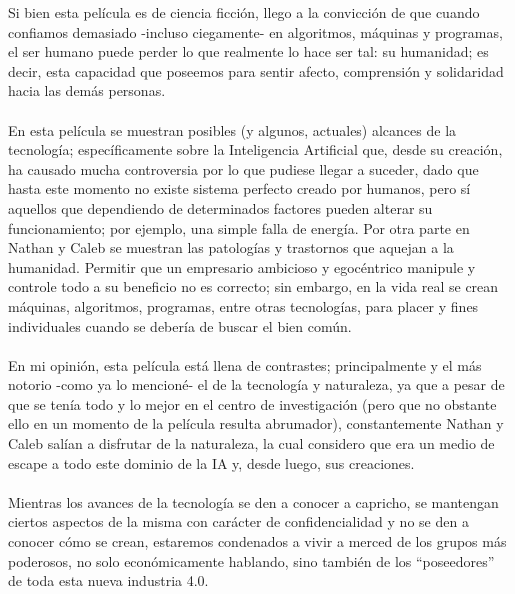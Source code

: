 \documentclass[letterpaper,12pt]{article} %
\begin{document}
	Si bien esta película es de ciencia ficción, llego a la convicción de que cuando confiamos demasiado -incluso ciegamente- en algoritmos, máquinas y programas, el ser humano puede perder lo que realmente lo hace ser tal: su humanidad; es decir, esta capacidad que poseemos para sentir afecto, comprensión y solidaridad hacia las demás personas.\\ \\
	En esta película se muestran posibles (y algunos, actuales) alcances de la tecnología; específicamente sobre la Inteligencia Artificial que, desde su creación, ha causado mucha controversia por lo que pudiese llegar a suceder, dado que hasta este momento no existe sistema perfecto creado por humanos, pero sí aquellos que dependiendo de determinados factores pueden alterar su funcionamiento; por ejemplo, una simple falla de energía. Por otra parte en Nathan y Caleb se muestran las patologías y trastornos que aquejan a la humanidad. Permitir que un empresario ambicioso y egocéntrico manipule y controle todo a su beneficio no es correcto; sin embargo, en la vida real se crean máquinas, algoritmos, programas, entre otras tecnologías, para placer y fines individuales cuando se debería de buscar el bien común.\\ \\
	En mi opinión, esta película está llena de contrastes; principalmente y el más notorio -como ya lo mencioné- el de la tecnología y naturaleza, ya que a pesar de que se tenía todo y lo mejor en el centro de investigación (pero que no obstante ello en un momento de la película resulta abrumador), constantemente Nathan y Caleb salían a disfrutar de la naturaleza, la cual considero que era un medio de escape a todo este dominio de la IA y, desde luego, sus creaciones.\\ \\
	Mientras los avances de la tecnología se den a conocer a capricho, se mantengan ciertos aspectos de la misma con carácter de confidencialidad y no se den a conocer cómo se crean, estaremos condenados a vivir a merced de los grupos más poderosos, no solo económicamente hablando, sino también de los “poseedores” de toda esta nueva industria 4.0.
\end{document}
